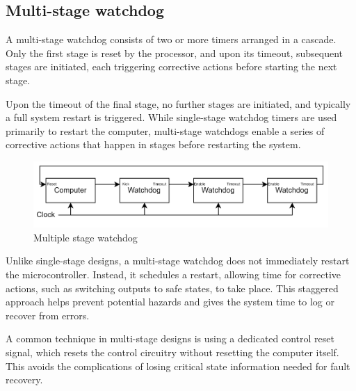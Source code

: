 \subsection{Multi-stage watchdog}
A multi-stage watchdog consists of two or more timers arranged in a cascade. 
Only the first stage is reset by the processor, and upon its timeout, subsequent stages are initiated, each triggering corrective actions before starting the next stage.

Upon the timeout of the final stage, no further stages are initiated, and typically a full system restart is triggered.
While single-stage watchdog timers are used primarily to restart the computer, multi-stage watchdogs enable a series of corrective actions that happen in stages before restarting the system.
\begin{figure}[H]
    \centering
    \includegraphics[width=0.75\linewidth]{images/swdog1.png}
    \caption{Multiple stage watchdog}
\end{figure}
Unlike single-stage designs, a multi-stage watchdog does not immediately restart the microcontroller. 
Instead, it schedules a restart, allowing time for corrective actions, such as switching outputs to safe states, to take place.
This staggered approach helps prevent potential hazards and gives the system time to log or recover from errors.

A common technique in multi-stage designs is using a dedicated control reset signal, which resets the control circuitry without resetting the computer itself. 
This avoids the complications of losing critical state information needed for fault recovery.


